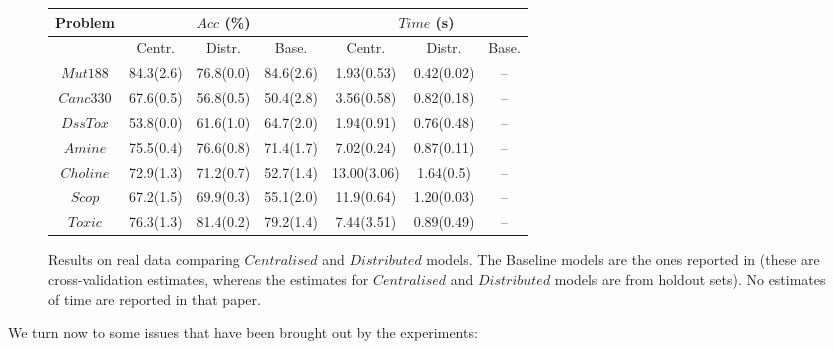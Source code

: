 % 
\begin{figure}[htb]
\begin{center}
{\small{
\begin{tabular}{|c|c|c|c||c|c|c|}\hline
Problem & \multicolumn{3}{|c||}{$Acc$ (\%)} & \multicolumn{3}{|c|}{$Time$ (s)} \\ \hline
         & Centr.   & Distr. & Base. & Centr. & Distr. & Base. \\ \cline{2-7}
         
$Mut188$ & 84.3(2.6) &  76.8(0.0) & 84.6(2.6) & 1.93(0.53)& 0.42(0.02)    & --  \\
$Canc330$ & 67.6(0.5)& 56.8(0.5)  & 50.4(2.8) & 3.56(0.58) & 0.82(0.18) & -- \\
$DssTox$ & 53.8(0.0) &  61.6(1.0) & 64.7(2.0) & 1.94(0.91) & 0.76(0.48) & --\\
$Amine$  & 75.5(0.4) & 76.6(0.8) &  71.4(1.7)         &7.02(0.24) &0.87(0.11)           & -- \\
$Choline$& 72.9(1.3)  &71.2(0.7) &     52.7(1.4)      &13.00(3.06)  &1.64(0.5)           & -- \\
$Scop$   & 67.2(1.5)  & 69.9(0.3) &   55.1(2.0)        &11.9(0.64)&1.20(0.03)           & -- \\
$Toxic$  &  76.3(1.3) &81.4(0.2) &  79.2(1.4)         &7.44(3.51)&0.89(0.49)           & -- \\ \hline
\end{tabular}
}}
\end{center}
\caption{Results on real data comparing $Centralised$ and $Distributed$ models.
    The Baseline models are the ones reported in
     (these are cross-validation estimates, whereas the
    estimates for $Centralised$ and $Distributed$ models are from holdout sets). No
    estimates of time are reported in that paper.}
\label{fig:tab2}
\end{figure}


\noindent We turn now to some issues that have been brought out by the experiments:

